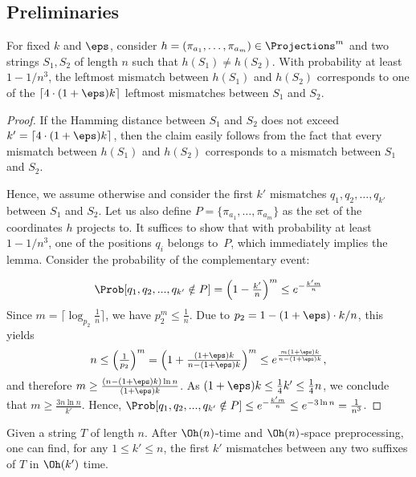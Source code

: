 \subsection{Preliminaries}
\begin{lemma}
\label{lm:mismatches}
For fixed $k$ and $\eps$, consider $h = (\pi_{a_1},\ldots,\pi_{a_m}) \in \Projections^m$ and two strings $S_1, S_2$ of length $n$ such that $h(S_1)\ne h(S_2)$.
With probability at least $1-1/n^3$, the leftmost mismatch between $h(S_1)$ and $h(S_2)$
corresponds to one of the $\lceil 4\cdot (1+\eps) k\rceil$ leftmost mismatches between $S_1$ and $S_2$. 
\end{lemma}
\begin{proof}
If the Hamming distance between $S_1$ and $S_2$ does not exceed $k' = \lceil 4 \cdot (1+\eps) k \rceil$,
then the claim easily follows from the fact that every mismatch between $h(S_1)$ and $h(S_2)$ corresponds to a mismatch between
$S_1$ and $S_2$.

Hence, we assume otherwise and consider the first $k'$ mismatches  $q_1, q_2, \ldots, q_{k'}$ between $S_1$ and $S_2$.
Let us also define $P = \{\pi_{a_1},\ldots,\pi_{a_m}\}$ as the set of the coordinates $h$ projects to. It suffices to show that with probability at least $1-1/n^3$, one of the positions $q_i$ belongs to~$P$, which immediately implies the lemma. Consider the probability of the complementary event:

\[\Prob[q_1,q_2,...,q_{k'} \notin P] =  \left(1-\tfrac{k'}{n}\right)^m \leq e^{-\frac{k'm}{n}}\]
%
Since $m = \lceil\log_{p_2}\frac{1}{n}\rceil$, we have $p_2^m \le \frac{1}{n}$.
Due to $p_2 = 1 - (1+\eps) \cdot k / n$, this yields
\[n \le \left(\tfrac{1}{p_2}\right)^m = \left(1+\tfrac{(1+\eps)k}{n-(1+\eps)k}\right)^m \le e^{\frac{m(1+\eps)k}{{n-(1+\eps)k}}},\]
and therefore $m \ge \frac{(n-(1+\eps)k)\ln n}{(1+\eps)k}$.
As $(1+\eps)k \le \frac14 k' \le \frac14n$, we conclude that
$m \ge \frac{3n\ln n}{k'}$.
Hence,
$\Prob[q_1,q_2,...,q_{k'} \notin P] \le e^{-\frac{k'm}{n}} \le e^{-3\ln n}= \frac{1}{n^3}$.
\end{proof}

\begin{lemma}
\label{lm:kangaroo}
Given a string $T$ of length $n$. After $\Oh(n)$-time and $\Oh(n)$-space preprocessing, one can find, for any $1 \le k' \le n$, the first $k'$ mismatches between any two suffixes of $T$ in $\Oh(k')$ time.
\end{lemma}


